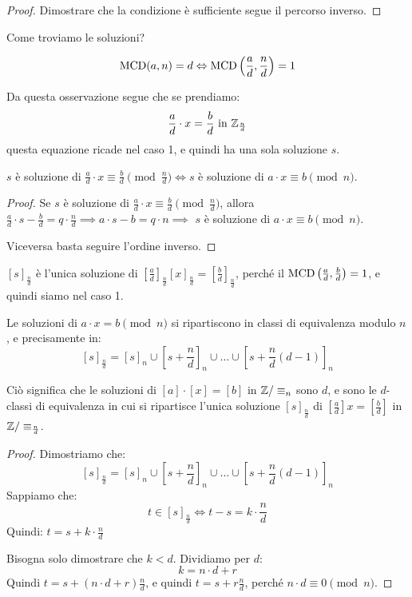 \begin{enumerate}
\begin{proof}
    Dimostrare che la condizione \`e sufficiente segue il percorso inverso.
    \end{proof}
    Come troviamo le soluzioni?
    \begin{oss}
    \[
    \operatorname{MCD}(a,n) = d \Leftrightarrow \operatorname{MCD} \left(\frac{a}{d}, \frac{n}{d} \right) = 1
    \]
    \end{oss}
    Da questa osservazione segue che se prendiamo:
    \[
    \frac{a}{d} \cdot x = \frac{b}{d} \text{ in } \mathbb{Z}_{\frac{n}{d}} 
    \]
    questa equazione ricade nel caso 1, e quindi ha una sola soluzione $s$.
    \begin{prop}
    $s$ \`e soluzione di $\frac{a}{d} \cdot x \equiv \frac{b}{d} \pmod{\frac{n}{d}} \iff s$ \`e soluzione di $a \cdot x \equiv b \pmod{n}$.
    \end{prop}
    \begin{proof}
    Se $s$ \`e soluzione di $\frac{a}{d} \cdot x \equiv \frac{b}{d} \pmod{\frac{n}{d}}$, allora $\frac{a}{d} \cdot s - \frac{b}{d} = q \cdot \frac{n}{d} \implies a \cdot s - b = q \cdot n \implies$ $s$ \`e soluzione di $a \cdot x \equiv b \pmod{n}$.

    Viceversa basta seguire l'ordine inverso.
    \end{proof}
    $[s]_{\frac{n}{d}}$ \`e l'unica soluzione di $\left[\frac{a}{d} \right]_{\frac{n}{d}} [x]_{\frac{n}{d}} = \left[\frac{b}{d} \right]_{\frac{n}{d}}$, perch\'e il $\operatorname{MCD} \left(\frac{a}{d}, \frac{b}{d} \right) = 1$, e quindi siamo nel caso 1.

    Le soluzioni di $a \cdot x = b \pmod{n}$ si ripartiscono in classi di equivalenza modulo $n$, e precisamente in:
    \[
    [s]_{\frac{n}{d}} = [s]_{n} \cup \left[s + \frac{n}{d} \right]_{n} \cup \ldots \cup \left[s + \frac{n}{d}(d-1) \right]_{n}
    \]

    Ci\`o significa che le soluzioni di $[a] \cdot [x] = [b]$ in $\mathbb{Z} / \equiv_n$ sono $d$, e sono le $d$-classi di equivalenza in cui si ripartisce l'unica soluzione $[s]_{\frac{n}{d}}$ di $[\frac{a}{d}] x = [\frac{b}{d}]$ in $\mathbb{Z} / \equiv_{\frac{n}{d}}$.

    \begin{proof}
    Dimostriamo che:
    \[
    [s]_{\frac{n}{d}} = [s]_{n} \cup \left[s + \frac{n}{d} \right]_{n} \cup \ldots \cup \left[s + \frac{n}{d}(d-1) \right]_{n}
    \]
    Sappiamo che:
    \[
    t \in [s]_{\frac{n}{d}} \iff t - s = k \cdot \frac{n}{d}
    \]
    Quindi: $t = s + k \cdot \frac{n}{d}$

    Bisogna solo dimostrare che $k < d$. Dividiamo per $d$:
    \[
    k = n \cdot d + r
    \]
    Quindi $t = s + (n \cdot d + r) \frac{n}{d}$, e quindi
    $t = s + r \frac{n}{d}$, perch\'e $n \cdot d \equiv 0 \pmod{n}$.


\end{proof}
\end{enumerate}
